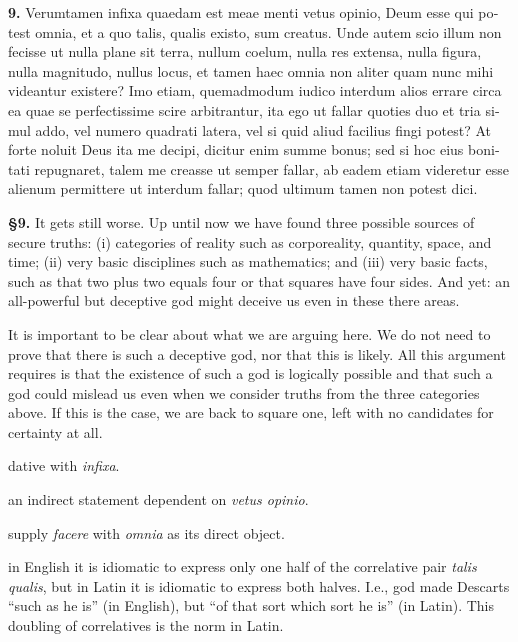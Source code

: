 \clearpage

\beginnumbering
\pstart
\begin{latin}
    \textenglish{\textbf{9.}} Verumtamen infixa quaedam est meae menti vetus opinio, Deum esse qui potest omnia, et a quo talis, qualis existo, sum creatus. Unde autem scio illum non fecisse ut nulla plane sit terra, nullum coelum, nulla res extensa, nulla figura, nulla magnitudo, nullus locus, et tamen haec omnia non aliter quam nunc mihi videantur existere? Imo etiam, quemadmodum iudico interdum alios errare circa ea quae se perfectissime scire arbitrantur, ita ego ut fallar quoties duo et tria simul addo, vel numero quadrati latera, vel si quid aliud facilius fingi potest? At forte noluit Deus ita me decipi, dicitur enim summe bonus; sed si hoc eius bonitati repugnaret, talem me creasse ut semper fallar, ab eadem etiam videretur esse alienum permittere ut interdum fallar; quod ultimum tamen non potest dici.
\end{latin}
\pend
\endnumbering

\prenotes

\textbf{§9.} It gets still worse. Up until now we have found three possible sources of secure truths: (i) categories of reality such as corporeality, quantity, space, and time; (ii) very basic disciplines such as mathematics; and (iii) very basic facts, such as that two plus two equals four or that squares have four sides. And yet: an all-powerful but deceptive god might deceive us even in these there areas.

It is important to be clear about what we are arguing here. We do not need to prove that there is such a deceptive god, nor that this is likely. All this argument requires is that the existence of such a god is logically possible and that such a god could mislead us even when we consider truths from the three categories above. If this is the case, we are back to square one, left with no candidates for certainty at all.

 dative with \textit{infixa}.

 an indirect statement dependent on \textit{vetus opinio}.

 supply \textit{facere} with \textit{omnia} as its direct object.

 in English it is idiomatic to express only one half of the correlative pair \textit{talis qualis}, but in Latin it is idiomatic to express both halves. I.e., god made Descarts ``such as he is'' (in English), but ``of that sort which sort he is'' (in Latin). This doubling of correlatives is the norm in Latin.

